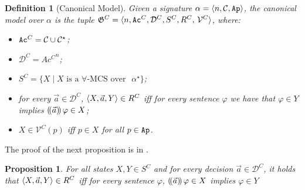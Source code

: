 \documentclass{article}
\newtheorem{definition}{Definition}
\newtheorem{proposition}{Proposition}
\begin{document}


\begin{definition}[Canonical Model]
\label{def:can_model}
Given a signature $\alpha=\langle n,\mathcal{C}, \texttt{Ap} \rangle$, 
the canonical model over $\alpha$ is the tuple $\G^C=\tuple{n, \Ac^C,\mathcal{D}^C, S^C, R^C,$    $\mathcal{V}^C}$, where: 

\begin{itemize}
    \item $\texttt{Ac}^C=\mathcal{C}\cup \mathcal{C}^\star$;
   
    \item $\mathcal{D}^C = {Ac^C}^n $;
 \item $S^C = \{X \mid X \text{ is a $\forall$-MCS over }$ $\alpha^\star\}$;
    \item for every $\vec{a}\in \mathcal{D}^C$, $\langle X,\vec{a}, Y \rangle\in R^C$ iff for every sentence $\varphi$  we have that $\varphi\in Y$ implies $(\!( \vec{a} )\!)\,\varphi \in X$;
    \item $X \in \mathcal{V}^C(p)$ iff $p\in X$ for all $p \in \texttt{Ap}$. 
\end{itemize}
\end{definition}

The proof of the next proposition is in \cite{csl}. %

\begin{proposition}\label{prop:existforall}
    For all states $X, Y \in S^C$ %
    and for every decision $\vec{a} \in \mathcal{D}^C$, it holds that $\langle X,\vec{a},Y \rangle\in R^C$ iff for every sentence $\varphi$, $(\!( \vec{a} )\!)\,\varphi\in X $ implies $\varphi\in Y$
\end{proposition}
    
\end{document}
